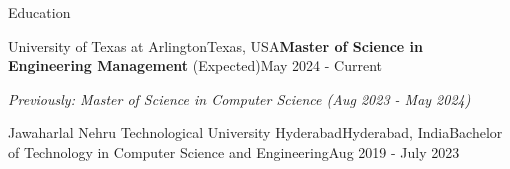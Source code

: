 \documentclass{resume} %
\begin{document}
\begin{rSection}{Education \vspace{.1em}}
\begin{rSubsection}{University of Texas at Arlington}{Texas, USA}{\textbf{Master of Science in Engineering Management} (Expected)}{May 2024 - Current}
\item \textit{Previously: Master of Science in Computer Science (Aug 2023 - May 2024)}
\end{rSubsection}

\begin{rSubsection}{Jawaharlal Nehru Technological University Hyderabad}{Hyderabad, India}{Bachelor of Technology in Computer Science and Engineering}{Aug 2019 - July 2023}
\end{rSubsection}
\end{rSection}
\end{document}
